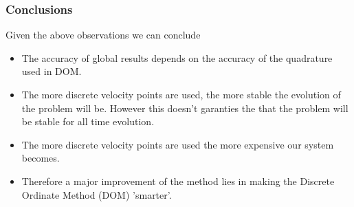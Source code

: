 \begin{frame}
	\frametitle{Conclusions}
	Given the above observations we can conclude
	\begin{itemize}
		\item The accuracy of global results depends on the accuracy of the quadrature used in DOM.
		\item The more discrete velocity points are used, the more stable the evolution of the problem will be. However this doesn't garanties the that the problem will be stable for all time evolution.
		\item The more discrete velocity points are used the more expensive our system becomes.
		\item Therefore a major improvement of the method lies in making the Discrete Ordinate Method (DOM) 'smarter'.
	\end{itemize}
	
\end{frame}